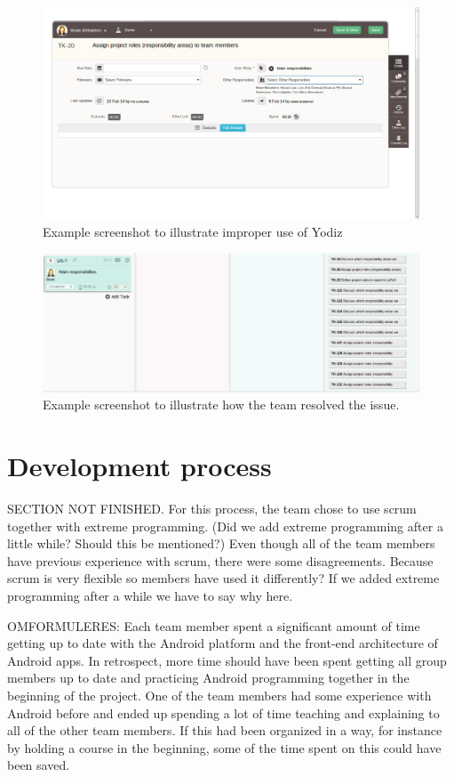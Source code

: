 \begin{figure}[H]
\includegraphics[width=\textwidth]{ch/retrospect/fig/wrongUse.png}
\caption{Example screenshot to illustrate improper use of Yodiz}
\label{fig:wrongUse}
\end{figure}

\begin{figure}[H]
\includegraphics[width=\textwidth]{ch/retrospect/fig/addsTasks.png}
\caption{Example screenshot to illustrate how the team resolved the issue.}
\label{fig:addsTasks}
\end{figure}


\section{Development process}
SECTION NOT FINISHED. For this process, the team chose to use scrum together with extreme programming. (Did we add extreme programming after a little while? Should this be mentioned?) Even though all of the team members have previous experience with scrum, there were some disagreements. Because scrum is very flexible so members have used it differently? If we added extreme programming after a while we have to say why here. 

OMFORMULERES: Each team member spent a significant amount of time getting up to date with the Android platform and the front-end architecture of Android apps. In retrospect, more time should have been spent getting all group members up to date and practicing Android programming together in the beginning of the project. One of the team members had some experience with Android before and ended up spending a lot of time teaching and explaining to all of the other team members. If this had been organized in a way, for instance by holding a course in the beginning, some of the time spent on this could have been saved. 


